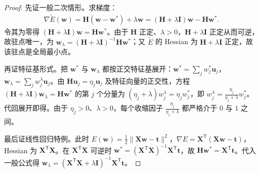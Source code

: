 \documentclass[../../main.tex]{subfiles}
\begin{document}
\begin{proof}
先证一般二次情形。求梯度：
\begin{align*}
\nabla\widetilde{E}(\boldsymbol{w})=\boldsymbol{H}(\boldsymbol{w}-\boldsymbol{w}^{*})+\lambda\boldsymbol{w}=(\boldsymbol{H}+\lambda\boldsymbol{I})\boldsymbol{w}-\boldsymbol{H}\boldsymbol{w}^{*}.
\end{align*}
令其为零得 $(\boldsymbol{H}+\lambda\boldsymbol{I})\boldsymbol{w}=\boldsymbol{H}\boldsymbol{w}^{*}$。由于 $\boldsymbol{H}$ 正定、$\lambda>0$，$\boldsymbol{H}+\lambda\boldsymbol{I}$ 正定从而可逆，故驻点唯一，为 $\boldsymbol{w}_{\lambda}=(\boldsymbol{H}+\lambda\boldsymbol{I})^{-1}\boldsymbol{H}\boldsymbol{w}^{*}$；又 $\widetilde E$ 的 Hessian 为 $\boldsymbol{H}+\lambda\boldsymbol{I}$ 正定，故该驻点是全局最小点。

再证特征基形式。把 $\boldsymbol{w}^{*}$ 与 $\boldsymbol{w}_{\lambda}$ 都按正交特征基展开：$\boldsymbol{w}^{*}=\sum_{j}w_{j}^{*}\boldsymbol{u}_{j}$，$\boldsymbol{w}_{\lambda}=\sum_{j}w_{j}^{\lambda}\boldsymbol{u}_{j}$。由 $\boldsymbol{H}\boldsymbol{u}_{j}=\eta_{j}\boldsymbol{u}_{j}$ 及特征向量的正交性，方程 $(\boldsymbol{H}+\lambda\boldsymbol{I})\boldsymbol{w}_{\lambda}=\boldsymbol{H}\boldsymbol{w}^{*}$ 的第 $j$ 个分量为 $(\eta_{j}+\lambda)w_{j}^{\lambda}=\eta_{j}w_{j}^{*}$，即 $w_{j}^{\lambda}=\frac{\eta_{j}}{\eta_{j}+\lambda}w_{j}^{*}$。代回展开即得。由于 $\eta_{j}>0$、$\lambda>0$，每个收缩因子 $\frac{\eta_{j}}{\eta_{j}+\lambda}$ 都严格介于 $0$ 与 $1$ 之间。

最后证线性回归特例。此时 $E(\boldsymbol{w})=\frac{1}{2}\|\boldsymbol{X}\boldsymbol{w}-\boldsymbol{t}\|^{2}$，$\nabla E=\boldsymbol{X}^{\mathsf T}(\boldsymbol{X}\boldsymbol{w}-\boldsymbol{t})$，Hessian 为 $\boldsymbol{X}^{\mathsf T}\boldsymbol{X}$。在 $\boldsymbol{X}^{\mathsf T}\boldsymbol{X}$ 可逆时 $\boldsymbol{w}^{*}=(\boldsymbol{X}^{\mathsf T}\boldsymbol{X})^{-1}\boldsymbol{X}^{\mathsf T}\boldsymbol{t}$，故 $\boldsymbol{H}\boldsymbol{w}^{*}=\boldsymbol{X}^{\mathsf T}\boldsymbol{t}$。代入一般公式得 $\boldsymbol{w}_{\lambda}=(\boldsymbol{X}^{\mathsf T}\boldsymbol{X}+\lambda\boldsymbol{I})^{-1}\boldsymbol{X}^{\mathsf T}\boldsymbol{t}$。
\end{proof}
\end{document}
